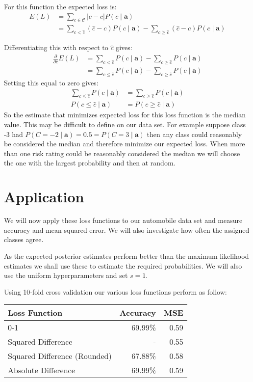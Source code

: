 For this function the expected loss is:
\begin{align}
	E(L) & = \sum_{c \in \mathcal{C}} |c - \hat{c}|P(c \mid \mathbf{a}) \\
	     & = \sum_{c < \hat{c}} (\hat{c} - c)P(c \mid \mathbf{a}) - \sum_{c \geq \hat{c}} (\hat{c} - c)P(c \mid \mathbf{a})
\end{align}

Differentiating this with respect to $\hat{c}$ gives:
\begin{align}
	\frac{\partial}{\partial \hat{c}} E(L) & = \sum_{c < \hat{c}} P(c \mid \mathbf{a}) - \sum_{c \geq \hat{c}} P(c \mid \mathbf{a}) \\
	& = \sum_{c \leq \hat{c}} P(c \mid \mathbf{a}) - \sum_{c \geq \hat{c}} P(c \mid \mathbf{a})
\end{align}
Setting this equal to zero gives:
\begin{align}
	\sum_{c \leq \hat{c}} P(c \mid \mathbf{a}) & = \sum_{c \geq \hat{c}} P(c \mid \mathbf{a}) \\
	P(c \leq \hat{c} \mid \mathbf{a}) & = P(c \geq \hat{c} \mid \mathbf{a})
\end{align}
So the estimate that minimizes expected loss for this loss function is the median value.
This may be difficult to define on our data set.
For example suppose class -3 had $P(C = -2 \mid \mathbf{a}) = 0.5 = P(C=3 \mid \mathbf{a})$ then any class could reasonably be considered the median and therefore minimize our expected loss.
When more than one risk rating could be reasonably considered the median we will choose the one with the largest probability and then at random.

\section{Application}
We will now apply these loss functions to our automobile data set and measure accuracy and mean squared error.
We will also investigate how often the assigned classes agree.

As the expected posterior estimates perform better than the maximum likelihood estimates we shall use these to estimate the required probabilities.
We will also use the uniform hyperparameters and set $s=1$.

Using 10-fold cross validation our various loss functions perform as follow:

\begin{center}
	\begin{tabular}{l r r}
		\hline
		Loss Function                & Accuracy & MSE  \\
		\hline
		0-1                          & 69.99\%  & 0.59 \\
		Squared Difference           & -        & 0.55 \\
		Squared Difference (Rounded) & 67.88\%  & 0.58 \\
		Absolute Difference          & 69.99\%  & 0.59 \\
		\hline
	\end{tabular}
\end{center}

